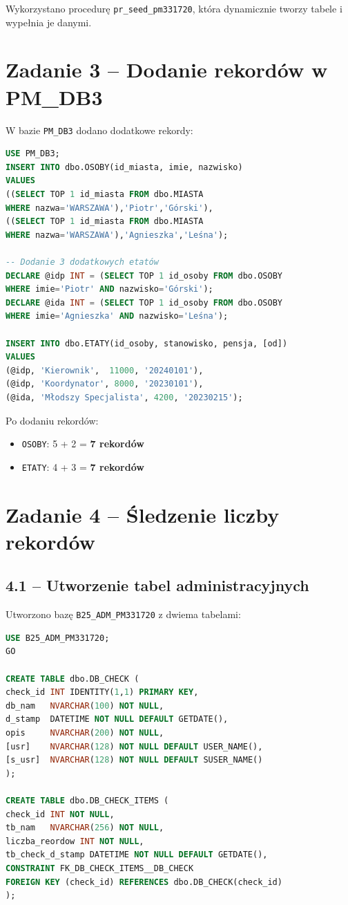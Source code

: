 \documentclass[a4paper,11pt]{article}
\begin{document}
	Wykorzystano procedurę \texttt{pr\_seed\_pm331720}, która dynamicznie tworzy tabele i wypełnia je danymi.

	
	\section{Zadanie 3 -- Dodanie rekordów w PM\_DB3}
	
	W bazie \texttt{PM\_DB3} dodano dodatkowe rekordy:
	
	\begin{lstlisting}[language=SQL]
USE PM_DB3;
INSERT INTO dbo.OSOBY(id_miasta, imie, nazwisko)
VALUES
((SELECT TOP 1 id_miasta FROM dbo.MIASTA 
WHERE nazwa='WARSZAWA'),'Piotr','Górski'),
((SELECT TOP 1 id_miasta FROM dbo.MIASTA 
WHERE nazwa='WARSZAWA'),'Agnieszka','Leśna');
		
-- Dodanie 3 dodatkowych etatów
DECLARE @idp INT = (SELECT TOP 1 id_osoby FROM dbo.OSOBY 
WHERE imie='Piotr' AND nazwisko='Górski');
DECLARE @ida INT = (SELECT TOP 1 id_osoby FROM dbo.OSOBY 
WHERE imie='Agnieszka' AND nazwisko='Leśna');
		
INSERT INTO dbo.ETATY(id_osoby, stanowisko, pensja, [od])
VALUES
(@idp, 'Kierownik',  11000, '20240101'),
(@idp, 'Koordynator', 8000, '20230101'),
(@ida, 'Młodszy Specjalista', 4200, '20230215');
	\end{lstlisting}
	
	Po dodaniu rekordów:
	\begin{itemize}
		\item \texttt{OSOBY}: 5 + 2 = \textbf{7 rekordów}
		\item \texttt{ETATY}: 4 + 3 = \textbf{7 rekordów}
	\end{itemize}
	
	\section{Zadanie 4 -- Śledzenie liczby rekordów}
	
	\subsection{4.1 -- Utworzenie tabel administracyjnych}
	
	Utworzono bazę \texttt{B25\_ADM\_PM331720} z dwiema tabelami:
	
	\begin{lstlisting}[language=SQL]
USE B25_ADM_PM331720;
GO
		
CREATE TABLE dbo.DB_CHECK (
check_id INT IDENTITY(1,1) PRIMARY KEY,
db_nam   NVARCHAR(100) NOT NULL,
d_stamp  DATETIME NOT NULL DEFAULT GETDATE(),
opis     NVARCHAR(200) NOT NULL,
[usr]    NVARCHAR(128) NOT NULL DEFAULT USER_NAME(),
[s_usr]  NVARCHAR(128) NOT NULL DEFAULT SUSER_NAME()
);
		
CREATE TABLE dbo.DB_CHECK_ITEMS (
check_id INT NOT NULL,
tb_nam   NVARCHAR(256) NOT NULL,
liczba_reordow INT NOT NULL,
tb_check_d_stamp DATETIME NOT NULL DEFAULT GETDATE(),
CONSTRAINT FK_DB_CHECK_ITEMS__DB_CHECK 
FOREIGN KEY (check_id) REFERENCES dbo.DB_CHECK(check_id)
);
	\end{lstlisting}
	
\end{document}
